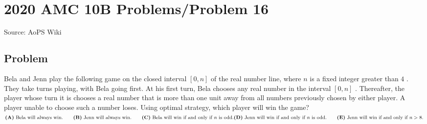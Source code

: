\documentclass[12pt]{article}
\begin{document}
\section*{{2020 AMC 10B Problems/Problem 16}}
Source: AoPS Wiki

\subsection*{Problem}
Bela and Jenn play the following game on the closed interval $[0, n]$ of the real number line, where $n$ is a fixed integer greater than $4$ . They take turns playing, with Bela going first. At his first turn, Bela chooses any real number in the interval $[0, n]$ . Thereafter, the player whose turn it is chooses a real number that is more than one unit away from all numbers previously chosen by either player. A player unable to choose such a number loses. Using optimal strategy, which player will win the game? $\textbf{(A)} \text{ Bela will always win.} \qquad \textbf{(B)} \text{ Jenn will always win.} \qquad \textbf{(C)} \text{ Bela will win if and only if }n \text{ is odd.} \\ \textbf{(D)} \text{ Jenn will win if and only if }n \text{ is odd.} \qquad \textbf{(E)} \text { Jenn will win if and only if } n>8.$
\end{document}
